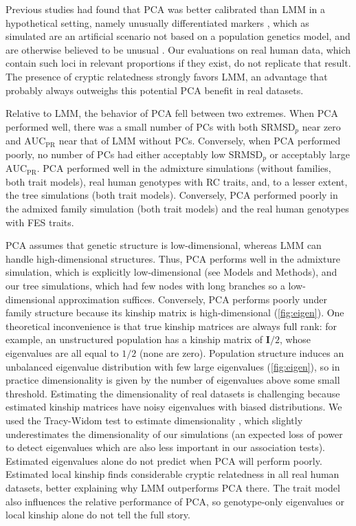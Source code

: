 \documentclass[11pt]{article}
\newcommand{\rmsd}{\text{SRMSD}_p}
\newcommand{\auc}{\text{AUC}_\text{PR}}
\begin{document}
Previous studies had found that PCA was better calibrated than LMM in a hypothetical setting, namely unusually differentiated markers \citep{price_new_2010, wu_comparison_2011, yang_advantages_2014}, which as simulated are an artificial scenario not based on a population genetics model, and are otherwise believed to be unusual \citep{sul_mixed_2013, price_response_2013}.
Our evaluations on real human data, which contain such loci in relevant proportions if they exist, do not replicate that result.
The presence of cryptic relatedness strongly favors LMM, an advantage that probably always outweighs this potential PCA benefit in real datasets.

Relative to LMM, the behavior of PCA fell between two extremes.
When PCA performed well, there was a small number of PCs with both $\rmsd$ near zero and $\auc$ near that of LMM without PCs.
Conversely, when PCA performed poorly, no number of PCs had either acceptably low $\rmsd$ or acceptably large $\auc$.
PCA performed well in the admixture simulations (without families, both trait models), real human genotypes with RC traits, and, to a lesser extent, the tree simulations (both trait models).
Conversely, PCA performed poorly in the admixed family simulation (both trait models) and the real human genotypes with FES traits.

PCA assumes that genetic structure is low-dimensional, whereas LMM can handle high-dimensional structures.
Thus, PCA performs well in the admixture simulation, which is explicitly low-dimensional (see Models and Methods), and our tree simulations, which had few nodes with long branches so a low-dimensional approximation suffices.
Conversely, PCA performs poorly under family structure because its kinship matrix is high-dimensional (\cref{fig:eigen}).
One theoretical inconvenience is that true kinship matrices are always full rank: for example, an unstructured population has a kinship matrix of $\mathbf{I}/2$, whose eigenvalues are all equal to $1/2$ (none are zero).
Population structure induces an unbalanced eigenvalue distribution with few large eigenvalues (\cref{fig:eigen}), so in practice dimensionality is given by the number of eigenvalues above some small threshold.
Estimating the dimensionality of real datasets is challenging because estimated kinship matrices have noisy eigenvalues with biased distributions.
We used the Tracy-Widom test to estimate dimensionality \citep{patterson_population_2006}, which slightly underestimates the dimensionality of our simulations (an expected loss of power to detect eigenvalues which are also less important in our association tests).
Estimated eigenvalues alone do not predict when PCA will perform poorly.
Estimated local kinship finds considerable cryptic relatedness in all real human datasets, better explaining why LMM outperforms PCA there.
The trait model also influences the relative performance of PCA, so genotype-only eigenvalues or local kinship alone do not tell the full story.
\end{document}
